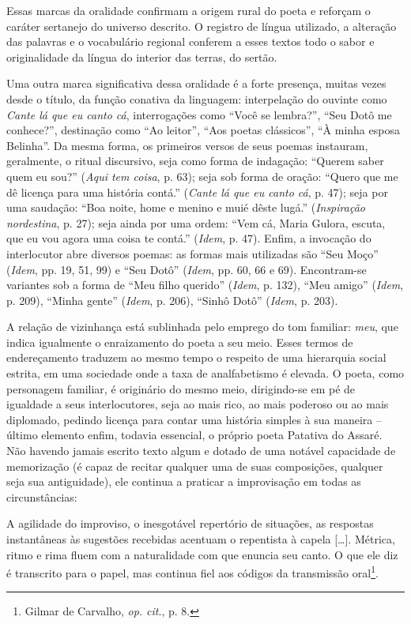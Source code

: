 \noindent Essas marcas da
oralidade confirmam a origem rural do poeta e reforçam o caráter sertanejo do
universo descrito. O registro de língua utilizado, a alteração das palavras e o
vocabulário regional conferem a esses textos todo o sabor e originalidade da
língua do interior das terras, do sertão.

Uma outra marca significativa dessa oralidade é a forte presença, muitas vezes
desde o título, da função conativa da linguagem: interpelação do ouvinte como
\textit{Cante lá que eu canto cá}, interrogações como “Você se lembra?”, “Seu Dotô me
conhece?”, destinação como “Ao leitor”, “Aos poetas clássicos”, “À minha esposa
Belinha”. Da mesma forma, os primeiros versos de seus poemas instauram,
geralmente, o ritual discursivo, seja como forma de indagação: “Querem saber
quem eu sou?” (\textit{Aqui tem coisa}, p. 63); seja sob forma de oração: “Quero que me dê licença
para uma história contá.” (\textit{Cante lá que eu canto cá}, p. 47); seja por uma saudação: “Boa noite, home
e menino e muié dêste lugá.” (\textit{Inspiração nordestina}, p. 27); seja ainda por uma ordem: “Vem cá,
Maria Gulora, escuta, que eu vou agora uma coisa te contá.” (\textit{Idem}, p. 47). Enfim,
a invocação do interlocutor abre diversos poemas: as formas mais utilizadas são
“Seu Moço” (\textit{Idem}, pp. 19, 51, 99) e “Seu Dotô” (\textit{Idem}, pp. 60, 66 e 69). Encontram-se
variantes sob a forma de “Meu filho querido” (\textit{Idem}, p. 132), “Meu amigo” (\textit{Idem}, p.
209), “Minha gente” (\textit{Idem}, p. 206), “Sinhô Dotô”
(\textit{Idem}, p. 203).

A relação de vizinhança está sublinhada pelo emprego do tom familiar: \textit{meu}, que
indica igualmente o enraizamento do poeta a seu meio. Esses termos de
endereçamento traduzem ao mesmo tempo o respeito de uma hierarquia social
estrita, em uma sociedade onde a taxa de analfabetismo é elevada. O poeta, como
personagem familiar, é originário do mesmo meio, dirigindo-se em pé de igualdade
a seus interlocutores, seja ao mais rico, ao mais poderoso ou ao mais diplomado,
pedindo licença para contar uma história simples à sua maneira -- último
elemento enfim, todavia essencial, o próprio poeta Patativa do Assaré. Não
havendo jamais escrito texto algum e dotado de uma notável capacidade de
memorização (é capaz de recitar qualquer uma de suas composições, qualquer seja
sua antiguidade), ele continua a praticar a improvisação em todas as
circunstâncias:

\begin{hedraquote}
A agilidade do improviso, o inesgotável repertório de
situações, as respostas instantâneas às sugestões recebidas acentuam o
repentista à capela [\ldots{}]. Métrica, ritmo e rima fluem com a naturalidade
com que enuncia seu canto. O que ele diz é transcrito para o papel, mas continua
fiel aos códigos da transmissão oral\footnote{ Gilmar de Carvalho, \textit{op.
cit}., p. 8.}. 
\end{hedraquote}

